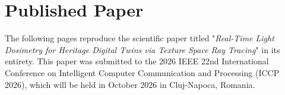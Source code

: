 \section{Published Paper}
\label{apx:scientific_paper}

The following pages reproduce the scientific paper titled "\textit{Real-Time Light Dosimetry for Heritage Digital Twins via Texture Space Ray Tracing}" in its entirety. This paper was submitted to the 2026 IEEE 22nd International Conference on Intelligent Computer Communication and Processing (ICCP 2026), which will be held in October 2026 in Cluj-Napoca, Romania.


